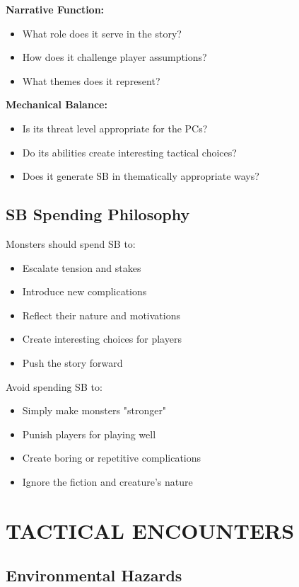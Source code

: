 \documentclass[12pt]{article}
\begin{document}
\begin{itemize}
\textbf{Narrative Function:}
\begin{itemize}
\item What role does it serve in the story?
\item How does it challenge player assumptions?
\item What themes does it represent?
\end{itemize}

\textbf{Mechanical Balance:}
\begin{itemize}
\item Is its threat level appropriate for the PCs?
\item Do its abilities create interesting tactical choices?
\item Does it generate SB in thematically appropriate ways?
\end{itemize}

\subsection*{SB Spending Philosophy}

Monsters should spend SB to:
\begin{itemize}
\item Escalate tension and stakes
\item Introduce new complications
\item Reflect their nature and motivations
\item Create interesting choices for players
\item Push the story forward
\end{itemize}

Avoid spending SB to:
\begin{itemize}
\item Simply make monsters "stronger"
\item Punish players for playing well
\item Create boring or repetitive complications
\item Ignore the fiction and creature's nature
\end{itemize}

\section{TACTICAL ENCOUNTERS}

\subsection*{Environmental Hazards}


\end{itemize}
\end{document}
